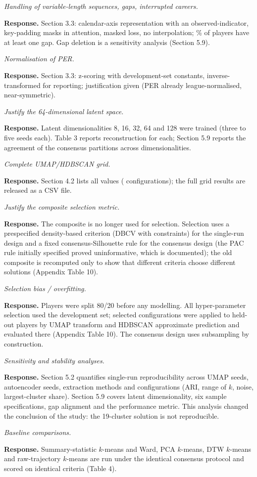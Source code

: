 \documentclass[11pt,a4paper]{article}
\newcommand{\point}[2]{\item[\textbf{#1}] \textit{#2}\par\vspace{2pt}}
\newcommand{\resp}{\par\noindent\textbf{Response.} }
\begin{document}
\begin{description}[leftmargin=1.2cm,style=nextline]
\point{5}{Handling of variable-length sequences, gaps, interrupted careers.}
\resp Section 3.3: calendar-axis representation with an observed-indicator, key-padding masks in attention, masked loss, no interpolation; \pctGapPlayers\% of players have at least one gap. Gap deletion is a sensitivity analysis (Section 5.9).

\point{6}{Normalisation of PER.}
\resp Section 3.3: z-scoring with development-set constants, inverse-transformed for reporting; justification given (PER already league-normalised, near-symmetric).

\point{7}{Justify the 64-dimensional latent space.}
\resp Latent dimensionalities 8, 16, 32, 64 and 128 were trained (three to five seeds each). Table 3 reports reconstruction for each; Section 5.9 reports the agreement of the consensus partitions across dimensionalities.

\point{8}{Complete UMAP/HDBSCAN grid.}
\resp Section 4.2 lists all values (\nGrid{} configurations); the full grid results are released as a CSV file.

\point{9}{Justify the composite selection metric.}
\resp The composite is no longer used for selection. Selection uses a prespecified density-based criterion (DBCV with constraints) for the single-run design and a fixed consensus-Silhouette rule for the consensus design (the PAC rule initially specified proved uninformative, which is documented); the old composite is recomputed only to show that different criteria choose different solutions (Appendix Table 10).

\point{10}{Selection bias / overfitting.}
\resp Players were split 80/20 before any modelling. All hyper-parameter selection used the development set; selected configurations were applied to held-out players by UMAP transform and HDBSCAN approximate prediction and evaluated there (Appendix Table 10). The consensus design uses subsampling by construction.

\point{11}{Sensitivity and stability analyses.}
\resp Section 5.2 quantifies single-run reproducibility across UMAP seeds, autoencoder seeds, extraction methods and configurations (ARI, range of $k$, noise, largest-cluster share). Section 5.9 covers latent dimensionality, six sample specifications, gap alignment and the performance metric. This analysis changed the conclusion of the study: the 19-cluster solution is not reproducible.

\point{12}{Baseline comparisons.}
\resp Summary-statistic $k$-means and Ward, PCA $k$-means, DTW $k$-means and raw-trajectory $k$-means are run under the identical consensus protocol and scored on identical criteria (Table 4).


\end{description}
\end{document}
